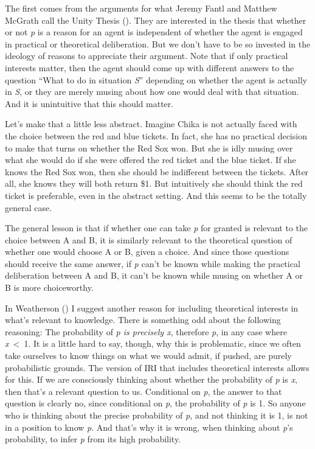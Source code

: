 \documentclass[
  10pt,
  letterpaper,
  DIV=11,
  numbers=noendperiod,
  twoside]{scrartcl}
\begin{document}
The first comes from the arguments for what Jeremy Fantl and Matthew
McGrath call the Unity Thesis (). They are interested in the thesis that whether
or not \emph{p} is a reason for an agent is independent of whether the
agent is engaged in practical or theoretical deliberation. But we don't
have to be so invested in the ideology of reasons to appreciate their
argument. Note that if only practical interests matter, then the agent
should come up with different answers to the question ``What to do in
situation \emph{S}'' depending on whether the agent is actually in
\emph{S}, or they are merely musing about how one would deal with that
situation. And it is unintuitive that this should matter.

Let's make that a little less abstract. Imagine Chika is not actually
faced with the choice between the red and blue tickets. In fact, she has
no practical decision to make that turns on whether the Red Sox won. But
she is idly musing over what she would do if she were offered the red
ticket and the blue ticket. If she knows the Red Sox won, then she
should be indifferent between the tickets. After all, she knows they
will both return \$1. But intuitively she should think the red ticket is
preferable, even in the abstract setting. And this seems to be the
totally general case.

The general lesson is that if whether one can take \emph{p} for granted
is relevant to the choice between A and B, it is similarly relevant to
the theoretical question of whether one would choose A or B, given a
choice. And since those questions should receive the same answer, if
\emph{p} can't be known while making the practical deliberation between
A and B, it can't be known while musing on whether A or B is more
choiceworthy.

In Weatherson () I suggest another
reason for including theoretical interests in what's relevant to
knowledge. There is something odd about the following reasoning: The
probability of \emph{p is precisely x}, therefore \emph{p}, in any case
where \emph{x}~\textless~1. It is a little hard to say, though, why this
is problematic, since we often take ourselves to know things on what we
would admit, if pushed, are purely probabilistic grounds. The version of
IRI that includes theoretical interests allows for this. If we are
consciously thinking about whether the probability of \emph{p} is
\emph{x}, then that's a relevant question to us. Conditional on
\emph{p}, the answer to that question is clearly no, since conditional
on \emph{p}, the probability of \emph{p} is 1. So anyone who is thinking
about the precise probability of \emph{p}, and not thinking it is 1, is
not in a position to know \emph{p}. And that's why it is wrong, when
thinking about \emph{p}'s probability, to infer \emph{p} from its high
probability.
\end{document}
